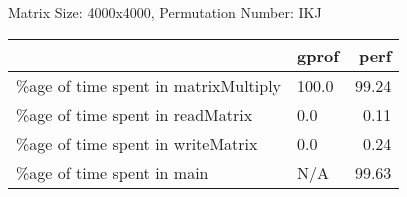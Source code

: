 \documentclass{article}
\begin{document}
    Matrix Size: 4000x4000, Permutation Number: IKJ \\
    \begin{tabular}{llr}
\hline
                                      & gprof   &   perf \\
\hline
 \%age of time spent in matrixMultiply & 100.0   &  99.24 \\
 \%age of time spent in readMatrix     & 0.0     &   0.11 \\
 \%age of time spent in writeMatrix    & 0.0     &   0.24 \\
 \%age of time spent in main           & N/A     &  99.63 \\
\hline
\end{tabular}
    
\end{document}
